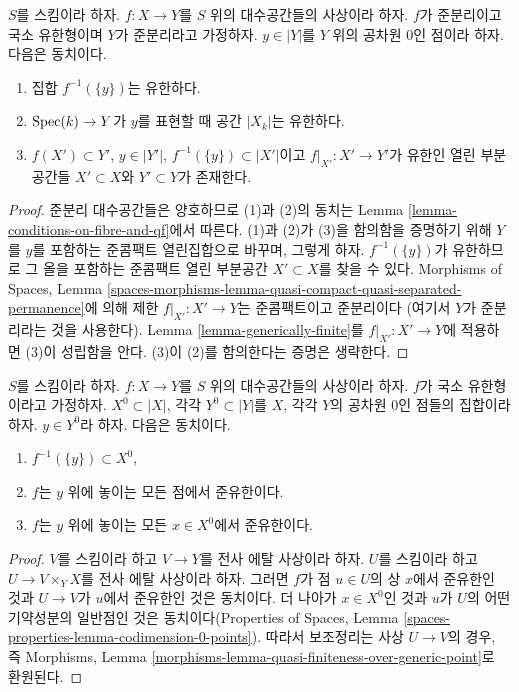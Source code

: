 \begin{lemma}
\label{lemma-generically-finite-reprise}
$S$를 스킴이라 하자. $f : X \to Y$를 $S$ 위의 대수공간들의
사상이라 하자. $f$가 준분리이고 국소 유한형이며 $Y$가 준분리라고
가정하자. $y \in |Y|$를 $Y$ 위의 공차원 $0$인 점이라 하자.
다음은 동치이다.
\begin{enumerate}
\item 집합 $f^{-1}(\{y\})$는 유한하다.
\item $\mathop{\mathrm{Spec}}(k) \to Y$가 $y$를 표현할 때 공간 $|X_k|$는 유한하다.
\item $f(X') \subset Y'$, $y \in |Y'|$,
$f^{-1}(\{y\}) \subset |X'|$이고
$f|_{X'} : X' \to Y'$가 유한인 열린 부분공간들
$X' \subset X$와 $Y' \subset Y$가 존재한다.
\end{enumerate}
\end{lemma}

\begin{proof}
준분리 대수공간들은 양호하므로 (1)과 (2)의 동치는 Lemma
\ref{lemma-conditions-on-fibre-and-qf}에서 따른다.
(1)과 (2)가 (3)을 함의함을 증명하기 위해 $Y$를 $y$를 포함하는
준콤팩트 열린집합으로 바꾸며, 그렇게 하자.
$f^{-1}(\{y\})$가 유한하므로
그 올을 포함하는 준콤팩트 열린 부분공간 $X' \subset X$를 찾을 수
있다. Morphisms of Spaces, Lemma
\ref{spaces-morphisms-lemma-quasi-compact-quasi-separated-permanence}에
의해 제한 $f|_{X'} : X' \to Y$는 준콤팩트이고 준분리이다
(여기서 $Y$가 준분리라는 것을 사용한다).
Lemma \ref{lemma-generically-finite}를
$f|_{X'} : X' \to Y$에 적용하면 (3)이 성립함을 안다.
(3)이 (2)를 함의한다는 증명은 생략한다.
\end{proof}

\begin{lemma}
\label{lemma-quasi-finiteness-over-generic-point}
$S$를 스킴이라 하자. $f : X \to Y$를 $S$ 위의 대수공간들의
사상이라 하자. $f$가 국소 유한형이라고 가정하자.
$X^0 \subset |X|$, 각각 $Y^0 \subset |Y|$를 $X$, 각각 $Y$의
공차원 $0$인 점들의 집합이라 하자. $y \in Y^0$라 하자.
다음은 동치이다.
\begin{enumerate}
\item $f^{-1}(\{y\}) \subset X^0$,
\item $f$는 $y$ 위에 놓이는 모든 점에서 준유한이다.
\item $f$는 $y$ 위에 놓이는 모든 $x \in X^0$에서 준유한이다.
\end{enumerate}
\end{lemma}

\begin{proof}
$V$를 스킴이라 하고 $V \to Y$를 전사 에탈 사상이라 하자.
$U$를 스킴이라 하고 $U \to V \times_Y X$를 전사 에탈 사상이라
하자. 그러면 $f$가 점 $u \in U$의 상 $x$에서 준유한인 것과
$U \to V$가 $u$에서 준유한인 것은 동치이다. 더 나아가
$x \in X^0$인 것과 $u$가 $U$의 어떤 기약성분의 일반점인 것은
동치이다(Properties of Spaces, Lemma
\ref{spaces-properties-lemma-codimension-0-points}).
따라서 보조정리는 사상 $U \to V$의 경우, 즉 Morphisms, Lemma
\ref{morphisms-lemma-quasi-finiteness-over-generic-point}로 환원된다.
\end{proof}

